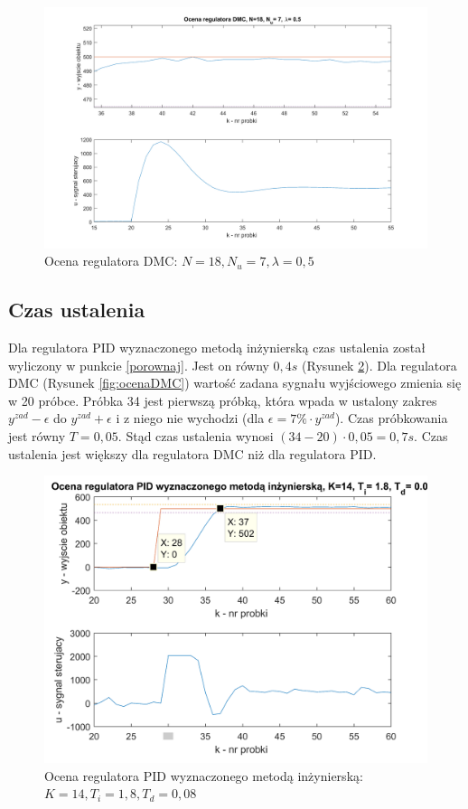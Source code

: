 \documentclass[a4paper, 10pt]{article}
\begin{document}
\begin{figure}[H]
	\centering
	\includegraphics[width=0.9\linewidth]{ocenaDMC_przereg}
	\caption{Ocena regulatora DMC: $N=18, N_{u}=7, \lambda=0,5$}
	\label{fig:ocenaDMC_przereg}
\end{figure}

\subsection{Czas ustalenia}
Dla regulatora PID wyznaczonego metodą inżynierską czas ustalenia został wyliczony w punkcie  \ref{porownaj}. Jest on równy $0,4s$ (Rysunek \ref{fig:ocenaPIDMI1}).
Dla regulatora DMC (Rysunek \ref{fig:ocenaDMC}) wartość zadana sygnału wyjściowego zmienia się w 20 próbce. Próbka 34 jest pierwszą próbką, która wpada w ustalony zakres $y^{zad}-\epsilon$ do $y^{zad}+\epsilon$ i z niego nie wychodzi (dla $\epsilon = 7\% \cdot y^{zad}$). Czas próbkowania jest równy $T=0,05$. Stąd czas ustalenia wynosi $(34-20)\cdot 0,05 = 0,7s$. 
Czas ustalenia jest większy dla regulatora DMC niż dla regulatora PID.

\begin{figure}[H]
	\centering
	\includegraphics[width=0.9\linewidth]{ocenaPIDMI}
	\caption{Ocena regulatora PID wyznaczonego metodą inżynierską: $K=14, T_{i}=1,8, T_{d}=0,08$}
	\label{fig:ocenaPIDMI1}
\end{figure}
\end{document}
